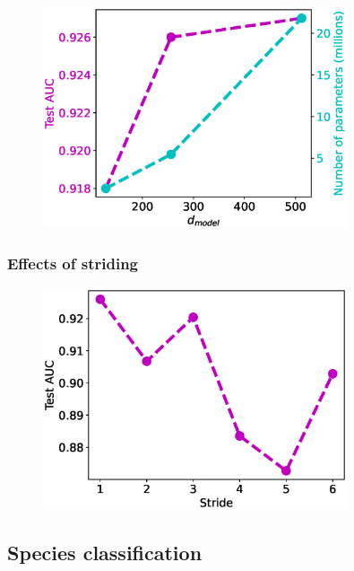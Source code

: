 \documentclass{article}
\begin{document}
\begin{figure}[H]
\center
\includegraphics[width=0.8\textwidth]{dmodel_test.eps}
%
\caption{}
\label{fig:dmodel test}
\end{figure}

\subsubsection{Effects of striding}

\begin{figure}[H]
\center
\includegraphics[width=0.8\textwidth]{stride_test.eps}
%
\caption{}
\label{fig:stride}
\end{figure}

\subsection{Species classification}



{}

\end{document}
